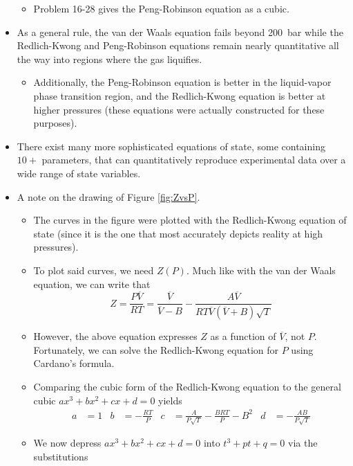\documentclass[../notes.tex]{subfiles}
\begin{document}
\begin{itemize}
\begin{itemize}
        \item Problem 16-28 gives the Peng-Robinson equation as a cubic.
    \end{itemize}
    \item As a general rule, the van der Waals equation fails beyond \SI{200}{\bar} while the Redlich-Kwong and Peng-Robinson equations remain nearly quantitative all the way into regions where the gas liquifies.
    \begin{itemize}
        \item Additionally, the Peng-Robinson equation is better in the liquid-vapor phase transition region, and the Redlich-Kwong equation is better at higher pressures (these equations were actually constructed for these purposes).
    \end{itemize}
    \item There exist many more sophisticated equations of state, some containing $10+$ parameters, that can quantitatively reproduce experimental data over a wide range of state variables.
    \item A note on the drawing of Figure \ref{fig:ZvsP}.
    \begin{itemize}
        \item The curves in the figure were plotted with the Redlich-Kwong equation of state (since it is the one that most accurately depicts reality at high pressures).
        \item To plot said curves, we need $Z(P)$. Much like with the van der Waals equation, we can write that
        \begin{equation*}
            Z = \frac{P\overline{V}}{RT}
            = \frac{\overline{V}}{\overline{V}-B}-\frac{A\overline{V}}{RT\overline{V}(\overline{V}+B)\sqrt{T}}
        \end{equation*}
        \item However, the above equation expresses $Z$ as a function of $\overline{V}$, not $P$. Fortunately, we can solve the Redlich-Kwong equation for $P$ using Cardano's formula.
        \item Comparing the cubic form of the Redlich-Kwong equation to the general cubic $ax^3+bx^2+cx+d=0$ yields
        \begin{align*}
            a &= 1&
            b &= -\frac{RT}{P}&
            c &= \frac{A}{P\sqrt{T}}-\frac{BRT}{P}-B^2&
            d &= -\frac{AB}{P\sqrt{T}}
        \end{align*}
        \item We now depress $ax^3+bx^2+cx+d=0$ into $t^3+pt+q=0$ via the substitutions

\end{itemize}
\end{itemize}
\end{document}
